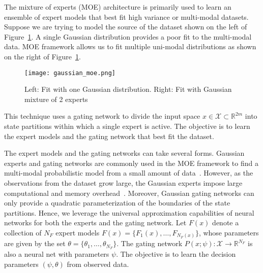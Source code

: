 The mixture of experts (MOE) architecture is primarily used to learn an ensemble
of expert models that best fit high variance or multi-modal datasets.
%
Suppose we are trying to model the source of the dataset shown on the left of
Figure~\ref{fig:gaussian_moe}.
%
A single Gaussian distribution provides a poor fit to the multi-modal data.
%
MOE framework allows us to fit multiple uni-modal distributions as shown on
the right of Figure~\ref{fig:gaussian_moe}.
\begin{figure}[tb]
  \centering
  \texttt{[image: gaussian\_moe.png]}
  \caption{Left: Fit with one Gaussian distribution. Right: Fit with Gaussian
  mixture of 2 experts~\cite{mcgonagle_dobre_pilling}}
  \label{fig:gaussian_moe}
\end{figure}
%
This technique uses a gating network to divide the input space $x \in
\mathcal{X} \subset \mathbb{R}^{2m}$ into state partitions within which a single
expert is active.
%
The objective is to learn the expert models and the gating network that
best fit the dataset.
%

The expert models and the gating networks can take several forms. 
%
Gaussian experts and gating networks are commonly used in the MOE framework to
find a multi-modal probabilistic model from a small amount of
data~\cite{bishop2006pattern}.
%
However, as the observations from the dataset grow large, the Gaussian experts
impose large computational and memory overhead~\cite{harkonen2022mixtures}.
%
Moreover, Gaussian gating networks can only provide a quadratic parameterization
of the boundaries of the state partitions.
%
Hence, we leverage the universal approximation capabilities of neural networks
for both the experts and the gating network.
%
Let $F(x)$ denote a collection of $N_F$ expert models $F(x) = \{F_1(x),
\dots, F_{N_{F}(x)}\}$, whose parameters are given by the set
$\theta=\{\theta_1, \dots, \theta_{N_{F}} \}$.
%
%
The gating network $P(x; \psi) : \mathcal{X} \rightarrow \mathbb{R}^{N_F}$ is
also a neural net with parameters $\psi$.
%
The objective is to learn the decision parameters $(\psi, \theta)$ from observed
data.

